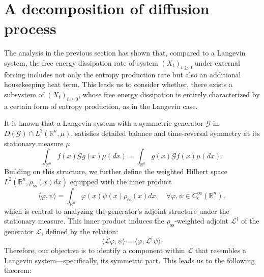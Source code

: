 \documentclass[10pt]{article}
\theoremstyle{definition}
\numberwithin{equation}{section}
\begin{document}
\section{A decomposition of diffusion process}\label{Sec4}
The analysis in the previous section has shown that, compared to a Langevin system, the free energy dissipation rate of system $(X_t)_{t\ge0}$ under external forcing includes not only the entropy production rate but also an additional housekeeping heat term. This leads us to consider whether, there exists a subsystem of $(X_t)_{t\ge0}$, whose free energy dissipation is entirely characterized by a certain form of entropy production, as in the Langevin case.

It is known that a Langevin system with a symmetric generator $\mathcal{G}$ in $D(\mathcal{G}) \cap L^2(\mathbb{R}^n, \mu)$, satisfies detailed balance and time-reversal symmetry at its stationary measure $\mu$
\begin{equation*}
    \int_{\mathbb{R}^n} f(x) \mathcal{G}g(x) \mu(dx) = \int_{\mathbb{R}^n} g(x) \mathcal{G} f(x) \mu(dx).
\end{equation*}
Building on this structure, we further define the weighted Hilbert space $L^2(\mathbb{R}^n, \rho_\mathrm{ss}(x) dx)$ equipped with the inner product
\begin{equation*}
    \langle \varphi, \psi \rangle = \int_{\mathbb{R}^n} \varphi(x) \psi(x)  \rho_\mathrm{ss}(x)  dx, \quad \forall \varphi, \psi \in C_\mathrm{c}^\infty(\mathbb{R}^n),
\end{equation*}
which is central to analyzing the generator's adjoint structure under the stationary measure. This inner product induces the $\rho_\mathrm{ss}$-weighted adjoint $\mathcal{L}^\dagger$ of the generator $\mathcal{L}$, defined by the relation:
\begin{equation*}
    \langle \mathcal{L} \varphi, \psi \rangle = \langle \varphi, \mathcal{L}^\dagger \psi \rangle.
\end{equation*}
Therefore, our objective is to identify a component within $\mathcal{L}$ that resembles a Langevin system—specifically, its symmetric part. This leads us to the following theorem:
\end{document}

